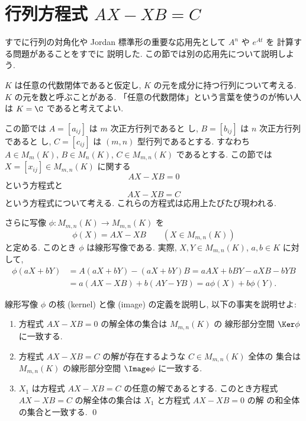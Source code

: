 \documentclass[12pt,twoside]{jarticle}
\begin{document}

\section{行列方程式 $AX-XB=C$}
\label{sec:AX-XB=C}

すでに行列の対角化や Jordan 標準形の重要な応用先として $A^n$ や $e^{At}$ を
計算する問題があることをすでに
説明した.  この節では別の応用先について説明しよう.

$K$ は任意の代数閉体であると仮定し, $K$ の元を成分に持つ行列について考える.
$K$ の元を数と呼ぶことがある. 「任意の代数閉体」という言葉を使うのが怖い人
は $K=\C$ であると考えてよい.

この節では $A=[a_{ij}]$ は $m$ 次正方行列であると
し, $B=[b_{ij}]$ は $n$ 次正方行列であると
し, $C=[c_{ij}]$ は $(m,n)$ 型行列であるとする.  
すなわち $A\in M_m(K)$, $B\in M_n(K)$, $C\in M_{m,n}(K)$ であるとする.
この節では $X=[x_{ij}]\in M_{m,n}(K)$ に関する
\begin{equation*}
  AX - XB = 0
\end{equation*}
という方程式と
\begin{equation*}
  AX - XB = C
\end{equation*}
という方程式について考える.  これらの方程式は応用上たびたび現われる.

さらに写像 $\phi:M_{m,n}(K)\to M_{m,n}(K)$ を
\begin{equation*}
  \phi(X) = AX - XB
  \qquad (X\in M_{m,n}(K))
\end{equation*}
と定める. このとき $\phi$ は線形写像である. 
実際, $X,Y\in M_{m,n}(K)$, $a,b\in K$ に対して, 
\begin{align*}
  \phi(aX+bY) 
  & = A(aX+bY)-(aX+bY)B = aAX + bBY - aXB - bYB
  \\ &
  = a(AX-XB) + b(AY-YB) = a\phi(X) + b\phi(Y).
\end{align*}


\begin{question}
\label{q:Ker-phi-Image-phi}
  線形写像 $\phi$ の核 (kernel) と像 (image) の定義を説明し, 
  以下の事実を説明せよ:
  \begin{enumerate}
  \item 方程式 $AX-XB=0$ の解全体の集合は $M_{m,n}(K)$ の
    線形部分空間 $\Ker\phi$ に一致する.
  \item 方程式 $AX-XB=C$ の解が存在するような $C\in M_{m,n}(K)$ 全体の
    集合は $M_{m,n}(K)$ の線形部分空間 $\Image\phi$ に一致する.
  \item $X_1$ は方程式 $AX-XB=C$ の任意の解であるとする.  
    このとき方程式 $AX-XB=C$ の解全体の集合は $X_1$ と方程式 $AX-XB=0$ の解
    の和全体の集合と一致する.
    \qed
  \end{enumerate}
\end{question}
\end{document}
